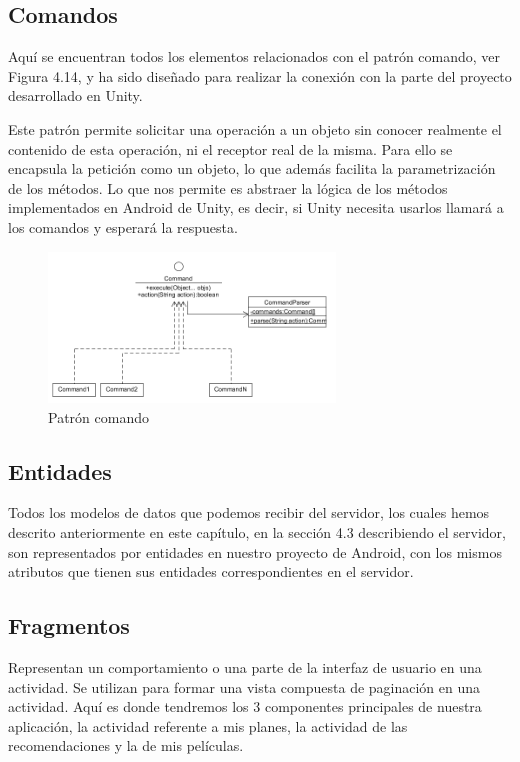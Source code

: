 \subsection{Comandos}
\label{makereference4.3.3}
Aquí se encuentran todos los elementos relacionados con el patrón comando, ver Figura 4.14, y ha sido diseñado para realizar la conexión con la parte del proyecto desarrollado en Unity.

Este patrón permite solicitar una operación a un objeto sin conocer realmente el contenido de esta operación, ni el receptor real de la misma. Para ello se encapsula la petición como un objeto, 
lo que además facilita la parametrización de los métodos.
Lo que nos permite es abstraer la lógica de los métodos implementados en Android de Unity, es decir, si Unity necesita usarlos llamará a los comandos y esperará la respuesta.

\begin{figure}[H]
    \centering
    \includegraphics[width=3in]{figures/chapter-4/command_pattern.png}
    \caption{Patrón comando}
\end{figure}



\subsection{Entidades}
\label{makereference4.3.4}
Todos los modelos de datos que podemos recibir del servidor, los cuales hemos descrito anteriormente en este capítulo, en la sección 4.3 describiendo el servidor, son representados por entidades en nuestro proyecto de Android, con los mismos atributos que tienen sus entidades correspondientes en el servidor.

\subsection{Fragmentos}
\label{makereference4.3.5}
Representan un comportamiento o una parte de la interfaz de usuario en una actividad.
Se utilizan para formar una vista compuesta de paginación en una actividad. 
Aquí es donde tendremos los 3 componentes principales de nuestra aplicación, la actividad referente a mis planes, la actividad de las recomendaciones y la de mis películas.

